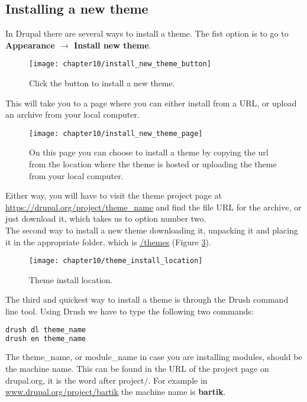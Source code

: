\subsection{Installing a new theme}

In Drupal there are several ways to install a theme. The fist option is to go to \textbf{Appearance $\rightarrow$ Install new theme}. 

\begin{figure}[H]
	\centering
	\texttt{[image: chapter10/install\_new\_theme\_button]}
	\caption{Click the button to install a new theme.}
	\label{fig:install_new_theme_button}
\end{figure}

This will take you to a page where you can either install from a URL, or upload an archive from your local computer.

\begin{figure}[H]
	\centering
	\texttt{[image: chapter10/install\_new\_theme\_page]}
	\caption{On this page you can choose to install a theme by copying the url from the location where the theme is hosted or uploading the theme from your local computer.}
	\label{fig:install_new_theme_page}
\end{figure}

Either way, you will have to visit the theme project page at \url{https://drupal.org/project/theme_name} and find the file URL for the archive, or just download it, which takes us to option number two.\\

The second way to install a new theme downloading it, unpacking it and placing it in the appropriate folder, which is \url{/themes} (Figure \ref{fig:theme_install_location}). 

\begin{figure}[H]
	\centering
	\texttt{[image: chapter10/theme\_install\_location]}
	\caption{Theme install location.}
	\label{fig:theme_install_location}
\end{figure}

The third and quickest way to install a theme is through the Drush command line tool. Using Drush we have to type the following two commands:

\begin{lstlisting}[language=bash]
drush dl theme_name
drush en theme_name
\end{lstlisting}

The theme\_name, or module\_name in case you are installing modules, should be the machine name. This can be found in the URL of the project page on drupal.org, it is the word after project/. For example in \url{www.drupal.org/project/bartik} the machine name is \textbf{bartik}.

